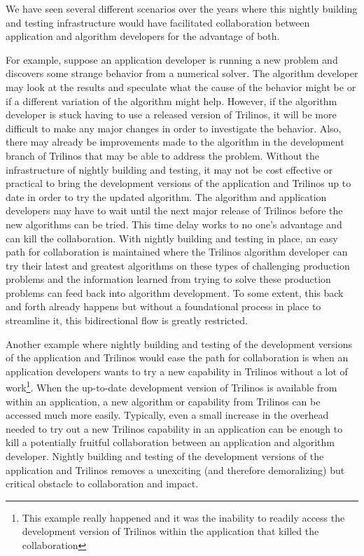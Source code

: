 \documentclass[pdf,ps2pdf,11pt]{SANDreport}
\begin{document}
We have seen several different scenarios over the years where this nightly
building and testing infrastructure would have facilitated collaboration
between application and algorithm developers for the advantage of both.

For example, suppose an application developer is running a new problem and
discovers some strange behavior from a numerical solver.  The algorithm
developer may look at the results and speculate what the cause of the behavior
might be or if a different variation of the algorithm might help.  However, if
the algorithm developer is stuck having to use a released version of Trilinos,
it will be more difficult to make any major changes in order to investigate
the behavior.  Also, there may already be improvements made to the algorithm
in the development branch of Trilinos that may be able to address the problem.
Without the infrastructure of nightly building and testing, it may not be cost
effective or practical to bring the development versions of the application
and Trilinos up to date in order to try the updated algorithm.  The algorithm
and application developers may have to wait until the next major release of
Trilinos before the new algorithms can be tried.  This time delay works to no
one's advantage and can kill the collaboration.  With nightly building and
testing in place, an easy path for collaboration is maintained where the
Trilinos algorithm developer can try their latest and greatest algorithms on
these types of challenging production problems and the information learned
from trying to solve these production problems can feed back into algorithm
development.  To some extent, this back and forth already happens but without
a foundational process in place to streamline it, this bidirectional flow is
greatly restricted.

Another example where nightly building and testing of the development versions
of the application and Trilinos would ease the path for collaboration is when
an application developers wants to try a new capability in Trilinos without a
lot of work\footnote{This example really happened and it was the inability to
readily access the development version of Trilinos within the application
that killed the collaboration}.  When the up-to-date development version of
Trilinos is available from within an application, a new algorithm or
capability from Trilinos can be accessed much more easily.  Typically, even a
small increase in the overhead needed to try out a new Trilinos capability in
an application can be enough to kill a potentially fruitful collaboration
between an application and algorithm developer.  Nightly building and testing
of the development versions of the application and Trilinos removes a
unexciting (and therefore demoralizing) but critical obstacle to collaboration
and impact.
\end{document}
